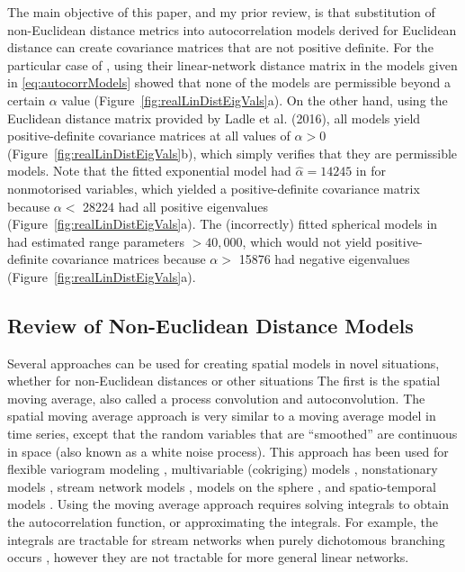 \documentclass[11pt, titlepage]{article}\usepackage[]{graphicx}\usepackage[]{color}
\begin{document}
\begin{spacing}{1.9}
\begin{flushleft}
The main objective of this paper, and my prior review, is that substitution of non-Euclidean distance metrics into autocorrelation models derived for Euclidean distance can create covariance matrices that are not positive definite. For the particular case of \citet{Ladl:Avga:Whea:Boyc:pred:2016}, using their linear-network distance matrix in the models given in \ref{eq:autocorrModels} showed that none of the models are permissible beyond a certain $\alpha$ value (Figure~\ref{fig:realLinDistEigVals}a).  On the other hand, using the Euclidean distance matrix provided by Ladle et al. (2016), all models yield positive-definite covariance matrices at all values of $\alpha > 0$ (Figure~\ref{fig:realLinDistEigVals}b), which simply verifies that they are permissible models.  Note that the fitted exponential model had $\hat{\alpha} = 14245$ in \citet{Ladl:Avga:Whea:Boyc:pred:2016} for nonmotorised variables, which yielded a positive-definite covariance matrix because $\alpha <$ 28224 had all positive eigenvalues (Figure~\ref{fig:realLinDistEigVals}a). The (incorrectly) fitted spherical models in \citet{Ladl:Avga:Whea:Boyc:pred:2016} had estimated range parameters $>40,000$, which would not yield positive-definite covariance matrices because $\alpha >$ 15876 had negative eigenvalues (Figure~\ref{fig:realLinDistEigVals}a).

\subsection*{Review of Non-Euclidean Distance Models}

Several approaches can be used for creating spatial models in novel situations, whether for non-Euclidean distances or other situations  The first is the spatial moving average, also called a process convolution and autoconvolution.  The spatial moving average approach is very similar to a moving average model in time series, except that the random variables that are ``smoothed'' are continuous in space (also known as a white noise process).  This approach has been used for flexible variogram modeling \citep{Barr:Ver:blac:1996}, multivariable (cokriging) models \citep{Ver:Barr:cons:1998,Ver:Cres:Barr:flex:2004}, nonstationary models \citep{Higd:proc:1998,Higd:Swal:Kern:non-:1999}, stream network models \citep{Ver:Pete:Theo:spat:2006, Cres:Frey:Harc:Smit:spat:2006, Ver:Pete:Move:2010}, models on the sphere \citep{Gnei:stri:2013}, and spatio-temporal models \citep{Wikl:kern:2002,Conn:John:Ver:spat:2015}. Using the moving average approach requires solving integrals to obtain the autocorrelation function, or approximating the integrals. For example, the integrals are tractable for stream networks when purely dichotomous branching occurs \citep{Ver:Pete:Theo:spat:2006}, however they are not tractable for more general linear networks. 


\end{flushleft}
\end{spacing}
\end{document}
